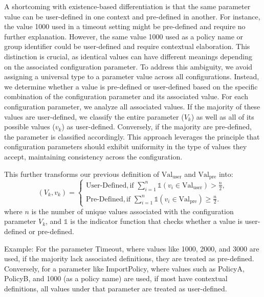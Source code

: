

 A shortcoming with existence-based differentiation is that the same parameter value can be user-defined in one context and pre-defined in another. For instance, the value 1000 used in a timeout setting might be pre-defined and require no further explanation. However, the same value 1000 used as a policy name or group identifier could be user-defined and require contextual elaboration. This distinction is crucial, as identical values can have different meanings depending on the associated configuration parameter. To address this ambiguity, we avoid assigning a universal type to a parameter value across all configurations. Instead, we determine whether a value is pre-defined or user-defined based on the specific combination of the configuration parameter and its associated value. For each configuration parameter, we analyze all associated values. If the majority of these values are user-defined, we classify the entire parameter (\(V_k\)) as well as all of its possible values (\(v_k\)) as user-defined. Conversely, if the majority are pre-defined, the parameter is classified accordingly. This approach leverages the principle that configuration parameters should exhibit uniformity in the type of values they accept, maintaining consistency across the configuration.

This further transforms our previous definition of \( \text{Val}_{\text{user}} \)  and \( \text{Val}_{\text{pre}} \)  into:
\[
(V_k, v_k) = 
\begin{cases} 
\text{User-Defined}, \text{if } \sum_{i=1}^{n} \mathbb{1}(v_i \in \text{Val}_{\text{user}}) > \frac{n}{2}, \\
\text{Pre-Defined}, \text{if } \sum_{i=1}^{n} \mathbb{1}(v_i \in \text{Val}_{\text{pre}}) \geq \frac{n}{2}.
\end{cases}
\]
where \( n \) is the number of unique values associated with the configuration parameter \( V_k \), and \( \mathbb{1} \) is the indicator function that checks whether a value is user-defined or pre-defined.


Example: For the parameter Timeout, where values like 1000, 2000, and 3000 are used, if the majority lack associated definitions, they are treated as pre-defined. Conversely, for a parameter like ImportPolicy, where values such as PolicyA, PolicyB, and 1000 (as a policy name) are used, if most have contextual definitions, all values under that parameter are treated as user-defined.


